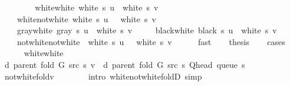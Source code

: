 \begin{isabellebody}
\ {\isacharminus}{\kern0pt}\isanewline
\ \ \isamarkupfalse%
\isanewline
\ \ \ \ {\isacharparenleft}{\kern0pt}white{\isacharunderscore}{\kern0pt}white{\isacharparenright}{\kern0pt}\ {\isachardoublequoteopen}white\ s\ u\ {\isasymand}\ white\ s\ v{\isachardoublequoteclose}\ {\isacharbar}{\kern0pt}\isanewline
\ \ \ \ {\isacharparenleft}{\kern0pt}white{\isacharunderscore}{\kern0pt}not{\isacharunderscore}{\kern0pt}white{\isacharparenright}{\kern0pt}\ {\isachardoublequoteopen}white\ s\ u\ {\isasymand}\ {\isasymnot}\ white\ s\ v{\isachardoublequoteclose}\ {\isacharbar}{\kern0pt}\isanewline
\ \ \ \ {\isacharparenleft}{\kern0pt}gray{\isacharunderscore}{\kern0pt}white{\isacharparenright}{\kern0pt}\ {\isachardoublequoteopen}gray\ s\ u\ {\isasymand}\ white\ s\ v{\isachardoublequoteclose}\ {\isacharbar}{\kern0pt}\isanewline
\ \ \ \ {\isacharparenleft}{\kern0pt}black{\isacharunderscore}{\kern0pt}white{\isacharparenright}{\kern0pt}\ {\isachardoublequoteopen}black\ s\ u\ {\isasymand}\ white\ s\ v{\isachardoublequoteclose}\ {\isacharbar}{\kern0pt}\isanewline
\ \ \ \ {\isacharparenleft}{\kern0pt}not{\isacharunderscore}{\kern0pt}white{\isacharunderscore}{\kern0pt}not{\isacharunderscore}{\kern0pt}white{\isacharparenright}{\kern0pt}\ {\isachardoublequoteopen}{\isasymnot}\ white\ s\ u\ {\isasymand}\ {\isasymnot}\ white\ s\ v{\isachardoublequoteclose}\isanewline
\ \ \ \ \isamarkupfalse%
\ fast\isanewline
\ \ \isamarkupfalse%
\ {\isacharquery}{\kern0pt}thesis\isanewline
\ \ \isamarkupfalse%
\ {\isacharparenleft}{\kern0pt}cases{\isacharparenright}{\kern0pt}\isanewline
\ \ \ \ \isamarkupfalse%
\ white{\isacharunderscore}{\kern0pt}white\isanewline
\ \ \ \ \isamarkupfalse%
\ {\isachardoublequoteopen}d\ {\isacharparenleft}{\kern0pt}parent\ {\isacharparenleft}{\kern0pt}fold\ G\ src\ s{\isacharparenright}{\kern0pt}{\isacharparenright}{\kern0pt}\ v\ {\isacharequal}{\kern0pt}\ d\ {\isacharparenleft}{\kern0pt}parent\ {\isacharparenleft}{\kern0pt}fold\ G\ src\ s{\isacharparenright}{\kern0pt}{\isacharparenright}{\kern0pt}\ {\isacharparenleft}{\kern0pt}Q{\isacharunderscore}{\kern0pt}head\ {\isacharparenleft}{\kern0pt}queue\ s{\isacharparenright}{\kern0pt}{\isacharparenright}{\kern0pt}\ {\isacharplus}{\kern0pt}\ {}{\isachardoublequoteclose}\isanewline
\ \ \ \ \ \ \isamarkupfalse%
\ not{\isacharunderscore}{\kern0pt}white{\isacharunderscore}{\kern0pt}fold{\isacharunderscore}{\kern0pt}v\isanewline
\ \ \ \ \ \ \isamarkupfalse%
\ {\isacharparenleft}{\kern0pt}intro\ white{\isacharunderscore}{\kern0pt}not{\isacharunderscore}{\kern0pt}white{\isacharunderscore}{\kern0pt}foldD{\isacharparenleft}{\kern0pt}{}{\isacharparenright}{\kern0pt}{\isacharparenright}{\kern0pt}\ simp\isanewline

\end{isabellebody}
